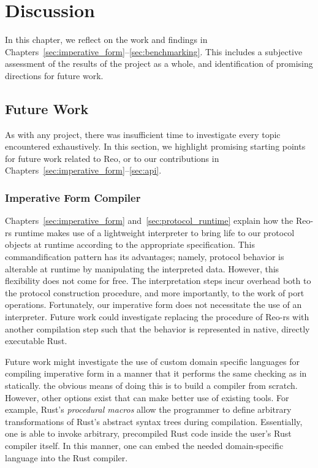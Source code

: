 \chapter{Discussion}
In this chapter, we reflect on the work and findings in Chapters~\ref{sec:imperative_form}--\ref{sec:benchmarking}. This includes a subjective assessment of the results of the project as a whole, and identification of promising directions for future work.

\label{sec:discussion}
\section{Future Work}
As with any project, there was insufficient time to investigate every topic encountered exhaustively. In this section, we highlight promising starting points for future work related to Reo, or to our contributions in Chapters~\ref{sec:imperative_form}--\ref{sec:api}.

\subsection{Imperative Form Compiler}
Chapters~\ref{sec:imperative_form} and~\ref{sec:protocol_runtime} explain how the Reo-rs runtime makes use of a lightweight interpreter to bring life to our protocol objects at runtime according to the appropriate specification. This commandification pattern has its advantages; namely, protocol behavior is alterable at runtime by manipulating the interpreted data. However, this flexibility does not come for free. The interpretation steps incur overhead both to the protocol construction procedure, and more importantly, to the work of port operations. Fortunately, our imperative form does not necessitate the use of an interpreter. Future work could investigate replacing the  procedure of Reo-rs with another compilation step such that the behavior is represented in native, directly executable Rust. 

Future work might investigate the use of custom domain specific languages for compiling imperative form in a manner that it performs the same checking as in  statically. the obvious means of doing this is to build a compiler from scratch. However, other options exist that can make better use of existing tools. For example, Rust's \textit{procedural macros} allow the programmer to define arbitrary transformations of Rust's abstract syntax trees during compilation. Essentially, one is able to invoke arbitrary, precompiled Rust code inside the user's Rust compiler itself. In this manner, one can embed the needed domain-specific language into the Rust compiler.

